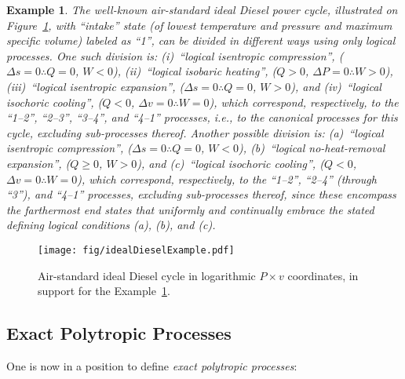 \documentclass[fleqn,11pt]{SelfArx}
\newtheorem{example}{Example}
\begin{document}
    \begin{example}\label{ex:ideal.Diesel}
        The   well-known   air-standard   ideal   Diesel    power    cycle,    illustrated    on
        Figure~\ref{fig:cycle.Diesel}, with ``intake'' state (of lowest temperature and pressure
        and maximum specific volume) labeled as ``1'', can be divided in  different  ways  using
        only logical processes. One such division is:  (i)~``logical  isentropic  compression'',
        ($\Delta s\!=\!0 \therefore Q\!=\!0$, $W\!\!<\!0$), (ii)~``logical  isobaric  heating'',
        ($Q\!>\!0$,  $\Delta  P\!=\!0   \therefore   W\!\!>\!0$),   (iii)~``logical   isentropic
        expansion'', ($\Delta s\!=\!0  \therefore  Q\!=\!0$,  $W\!\!>\!0$),  and  (iv)~``logical
        isochoric  cooling'',  ($Q\!<\!0$,  $\Delta  v\!=\!0   \therefore   W\!\!=\!0$),   which
        correspond, respectively, to the ``1--2'', ``2--3'', ``3--4'', and  ``4--1''  processes,
        i.e., to the canonical  processes  for  this  cycle,  excluding  sub-processes  thereof.
        Another possible division is: (a)~``logical isentropic compression'',  ($\Delta  s\!=\!0
        \therefore   Q\!=\!0$,   $W\!\!<\!0$),   (b)~``logical   no-heat-removal    expansion'',
        ($Q\!\geqslant\!0$, $W\!\!>\!0$), and  (c)~``logical  isochoric  cooling'',  ($Q\!<\!0$,
        $\Delta v\!=\!0 \therefore W\!\!=\!0$), which correspond, respectively, to the ``1--2'',
        ``2--4'' (through ``3''), and ``4--1'' processes, excluding sub-processes thereof, since
        these encompass the farthermost end states that uniformly and  continually  embrace  the
        stated defining logical conditions (a), (b), and (c).
    \end{example}

    \begin{figure}[ht]
        \centering
        \texttt{[image: fig/idealDieselExample.pdf]}
        \caption{Air-standard ideal Diesel cycle in  logarithmic  $P\times  v$  coordinates,  in
            support for the Example~\ref{ex:ideal.Diesel}.}
        \label{fig:cycle.Diesel}
    \end{figure}

    \subsection{Exact Polytropic Processes}

    One is now in a position to define \emph{exact polytropic processes}:
\end{document}
